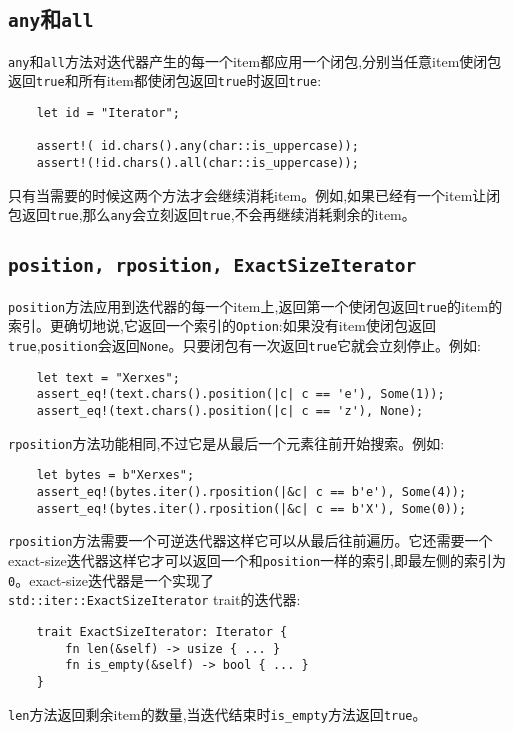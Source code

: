 \subsection{\texttt{any}和\texttt{all}}
\texttt{any}和\texttt{all}方法对迭代器产生的每一个item都应用一个闭包,分别当任意item使闭包返回\texttt{true}和所有item都使闭包返回\texttt{true}时返回\texttt{true}:
\begin{verbatim}
    let id = "Iterator";

    assert!( id.chars().any(char::is_uppercase));
    assert!(!id.chars().all(char::is_uppercase));
\end{verbatim}

只有当需要的时候这两个方法才会继续消耗item。例如,如果已经有一个item让闭包返回\texttt{true},那么\texttt{any}会立刻返回\texttt{true},不会再继续消耗剩余的item。

\subsection{\texttt{position, rposition, ExactSizeIterator}}
\texttt{position}方法应用到迭代器的每一个item上,返回第一个使闭包返回\texttt{true}的item的索引。更确切地说,它返回一个索引的\texttt{Option}:如果没有item使闭包返回\texttt{true},\texttt{position}会返回\texttt{None}。只要闭包有一次返回\texttt{true}它就会立刻停止。例如:
\begin{verbatim}
    let text = "Xerxes";
    assert_eq!(text.chars().position(|c| c == 'e'), Some(1));
    assert_eq!(text.chars().position(|c| c == 'z'), None);
\end{verbatim}

\texttt{rposition}方法功能相同,不过它是从最后一个元素往前开始搜索。例如:
\begin{verbatim}
    let bytes = b"Xerxes";
    assert_eq!(bytes.iter().rposition(|&c| c == b'e'), Some(4));
    assert_eq!(bytes.iter().rposition(|&c| c == b'X'), Some(0));
\end{verbatim}
\texttt{rposition}方法需要一个可逆迭代器这样它可以从最后往前遍历。它还需要一个exact-size迭代器这样它才可以返回一个和\texttt{position}一样的索引,即最左侧的索引为\texttt{0}。exact-size迭代器是一个实现了\\
\texttt{std::iter::ExactSizeIterator} trait的迭代器:
\begin{verbatim}
    trait ExactSizeIterator: Iterator {
        fn len(&self) -> usize { ... }
        fn is_empty(&self) -> bool { ... }
    }
\end{verbatim}

\texttt{len}方法返回剩余item的数量,当迭代结束时\texttt{is\_empty}方法返回\texttt{true}。

